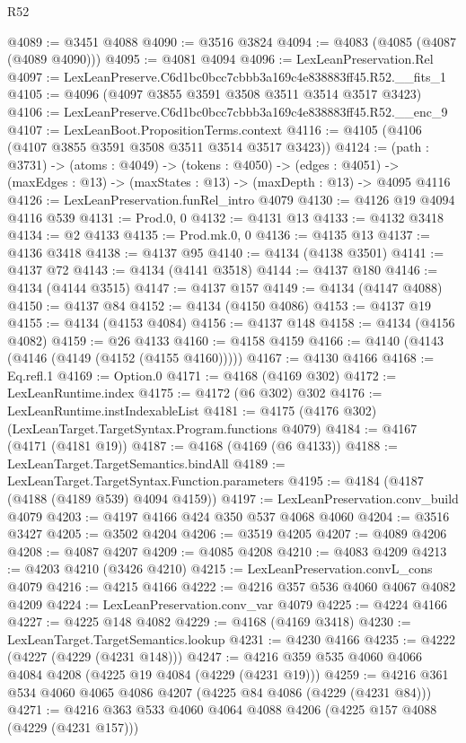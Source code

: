 \begin{lexlean}{R52}
\begin{coremodule}
@4089 := @3451 @4088
@4090 := @3516 @3824
@4094 := @4083 (@4085 (@4087 (@4089 @4090)))
@4095 := @4081 @4094
@4096 := LexLeanPreservation.Rel
@4097 := LexLeanPreserve.C6d1bc0bcc7cbbb3a169c4e838883ff45.R52.__fits_1
@4105 := @4096 (@4097 @3855 @3591 @3508 @3511 @3514 @3517 @3423)
@4106 := LexLeanPreserve.C6d1bc0bcc7cbbb3a169c4e838883ff45.R52.__enc_9
@4107 := LexLeanBoot.PropositionTerms.context
@4116 := @4105 (@4106 (@4107 @3855 @3591 @3508 @3511 @3514 @3517 @3423))
@4124 := (path : @3731) ->
  (atoms : @4049) ->
  (tokens : @4050) ->
  (edges : @4051) -> (maxEdges : @13) -> (maxStates : @13) -> (maxDepth : @13) -> @4095 @4116
@4126 := LexLeanPreservation.funRel_intro @4079
@4130 := @4126 @19 @4094 @4116 @539
@4131 := Prod.{0, 0}
@4132 := @4131 @13
@4133 := @4132 @3418
@4134 := @2 @4133
@4135 := Prod.mk.{0, 0}
@4136 := @4135 @13
@4137 := @4136 @3418
@4138 := @4137 @95
@4140 := @4134 (@4138 @3501)
@4141 := @4137 @72
@4143 := @4134 (@4141 @3518)
@4144 := @4137 @180
@4146 := @4134 (@4144 @3515)
@4147 := @4137 @157
@4149 := @4134 (@4147 @4088)
@4150 := @4137 @84
@4152 := @4134 (@4150 @4086)
@4153 := @4137 @19
@4155 := @4134 (@4153 @4084)
@4156 := @4137 @148
@4158 := @4134 (@4156 @4082)
@4159 := @26 @4133
@4160 := @4158 @4159
@4166 := @4140 (@4143 (@4146 (@4149 (@4152 (@4155 @4160)))))
@4167 := @4130 @4166
@4168 := Eq.refl.{1}
@4169 := Option.{0}
@4171 := @4168 (@4169 @302)
@4172 := LexLeanRuntime.index
@4175 := @4172 (@6 @302) @302
@4176 := LexLeanRuntime.instIndexableList
@4181 := @4175 (@4176 @302) (LexLeanTarget.TargetSyntax.Program.functions @4079)
@4184 := @4167 (@4171 (@4181 @19))
@4187 := @4168 (@4169 (@6 @4133))
@4188 := LexLeanTarget.TargetSemantics.bindAll
@4189 := LexLeanTarget.TargetSyntax.Function.parameters
@4195 := @4184 (@4187 (@4188 (@4189 @539) @4094 @4159))
@4197 := LexLeanPreservation.conv_build @4079
@4203 := @4197 @4166 @424 @350 @537 @4068 @4060
@4204 := @3516 @3427
@4205 := @3502 @4204
@4206 := @3519 @4205
@4207 := @4089 @4206
@4208 := @4087 @4207
@4209 := @4085 @4208
@4210 := @4083 @4209
@4213 := @4203 @4210 (@3426 @4210)
@4215 := LexLeanPreservation.convL_cons @4079
@4216 := @4215 @4166
@4222 := @4216 @357 @536 @4060 @4067 @4082 @4209
@4224 := LexLeanPreservation.conv_var @4079
@4225 := @4224 @4166
@4227 := @4225 @148 @4082
@4229 := @4168 (@4169 @3418)
@4230 := LexLeanTarget.TargetSemantics.lookup
@4231 := @4230 @4166
@4235 := @4222 (@4227 (@4229 (@4231 @148)))
@4247 := @4216 @359 @535 @4060 @4066 @4084 @4208 (@4225 @19 @4084 (@4229 (@4231 @19)))
@4259 := @4216 @361 @534 @4060 @4065 @4086 @4207 (@4225 @84 @4086 (@4229 (@4231 @84)))
@4271 := @4216 @363 @533 @4060 @4064 @4088 @4206 (@4225 @157 @4088 (@4229 (@4231 @157)))

\end{coremodule}
\end{lexlean}

